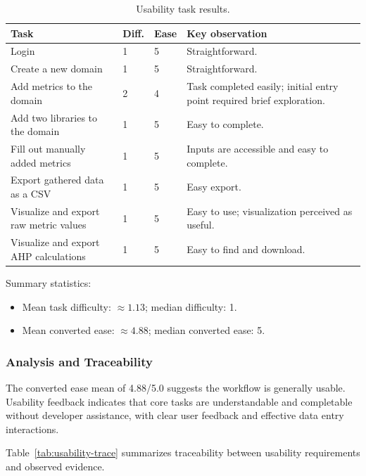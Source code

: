 \documentclass[12pt, titlepage]{article}
\begin{document}
\begin{table}[H]
  \centering
  \caption{Usability task results.}
  \label{tab:usability-pilot}
  \begin{tabular}{@{}p{}p{}p{}%
                  p{}@{}}
    \toprule
    \textbf{Task} & \textbf{Diff.} & \textbf{Ease} & \textbf{Key observation} \\
    \midrule
    Login &
      1 & 5 &
      Straightforward. \\
    Create a new domain &
      1 & 5 &
      Straightforward. \\
    Add metrics to the domain &
      2 & 4 &
      Task completed easily; initial entry point required brief exploration. \\
    Add two libraries to the domain &
      1 & 5 &
      Easy to complete. \\
    Fill out manually added metrics &
      1 & 5 &
      Inputs are accessible and easy to complete. \\
    Export gathered data as a CSV &
      1 & 5 &
      Easy export. \\
    Visualize and export raw metric values &
      1 & 5 &
      Easy to use; visualization perceived as useful. \\
    Visualize and export AHP calculations &
      1 & 5 &
      Easy to find and download. \\
    \bottomrule
  \end{tabular}
\end{table}

Summary statistics:
\begin{itemize}
  \item Mean task difficulty: $\approx 1.13$; median difficulty: 1.
  \item Mean converted ease: $\approx 4.88$; median converted ease: 5.
\end{itemize}

\subsubsection{Analysis and Traceability}
The converted ease mean of 4.88/5.0 suggests the workflow is generally usable.
Usability feedback indicates that core tasks are understandable and
completable without developer assistance, with clear user feedback and
effective data entry interactions.

Table~\ref{tab:usability-trace} summarizes traceability between usability
requirements and observed evidence.
\end{document}

